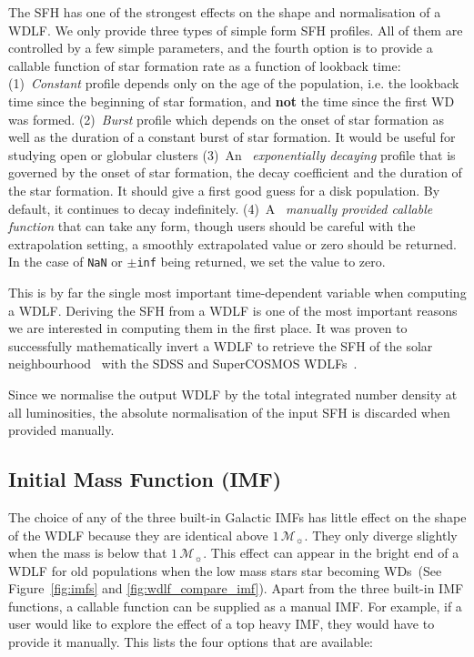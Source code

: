 \documentclass[fleqn,usenatbib]{rasti}
\newcommand{\msun}{\mathcal{M}_{\sun}}
\begin{document}
The SFH has one of the strongest effects on the shape and normalisation of a
WDLF. We only provide three types of simple form SFH profiles. All of them are
controlled by a few simple parameters, and the fourth option is to provide a
callable function of star formation rate as a function of lookback time:
(1)~\textit{Constant} profile depends only on the age of the population,
i.e. the lookback time since the beginning of star formation,
and \textbf{not} the time since the first WD was formed. (2)~\textit{Burst}
profile which depends on the onset of star formation as well as the duration
of a constant burst of star formation. It would be useful for studying open
or globular clusters (3)~An ~\textit{exponentially decaying}
profile that is governed by the onset of star formation, the decay coefficient
and the duration of the star formation. It should give a
first good guess for a disk population. By default, it continues to decay
indefinitely. (4)~A ~\textit{manually provided callable function} that can take
any form, though users should be careful with the extrapolation setting,
a smoothly extrapolated value or zero should be returned. In
the case of \texttt{NaN} or $\pm$\texttt{inf} being returned, we set the value to zero.

This is by far the single most important time-dependent variable when
computing a WDLF. Deriving the SFH from a WDLF is one of the most important
reasons we are interested in computing them in the first place. It was proven
to successfully mathematically invert a WDLF to retrieve the SFH of the solar
neighbourhood~\citep{2013MNRAS.434.1549R} with the SDSS and SuperCOSMOS
WDLFs~\citep{2006AJ....132.1221H, 2011MNRAS.417...93R}.

Since we normalise the output WDLF by the total integrated number density at
all luminosities, the absolute normalisation of the input SFH is discarded when
provided manually.



\subsection{Initial Mass Function (IMF)}
The choice of any of the three built-in Galactic IMFs has little
effect on the shape of the WDLF because they are identical above $1\,\msun$.
They only diverge slightly when the mass is below that $1\,\msun$. This effect
can appear in the bright end of a WDLF for old populations when the low mass
stars star becoming WDs~(See Figure~\ref{fig:imfs} and
\ref{fig:wdlf_compare_imf}). Apart from the three built-in IMF functions, a
callable function can be supplied as a manual IMF. For
example, if a user would like to explore the effect of a top heavy IMF, they
would have to provide it manually. This lists the four options that are
available:
\end{document}

